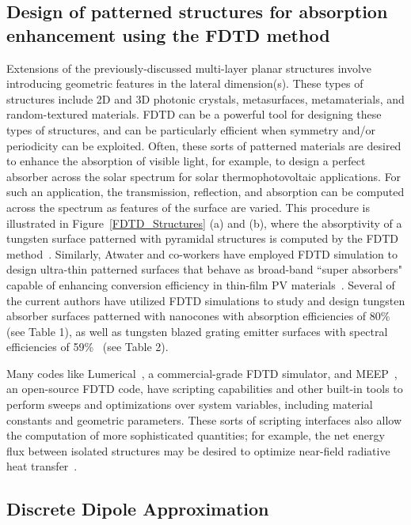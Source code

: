 \documentclass[10pt,letterpaper]{article}
\begin{document}
\subsection{Design of patterned structures for absorption enhancement using the FDTD method}
Extensions of the previously-discussed multi-layer planar structures involve introducing geometric features in the
lateral dimension(s).  These types of structures include 2D and 3D photonic crystals, metasurfaces, metamaterials, and random-textured materials.
FDTD can be a powerful tool for designing these types of structures, and can be particularly efficient when symmetry and/or periodicity can be
exploited.  Often, these sorts of patterned materials are desired to enhance the absorption of visible light, for example, to design a perfect
absorber across the solar spectrum for solar thermophotovoltaic applications.  For such an application, the transmission, reflection, and
absorption can be computed across the spectrum as features of the surface are varied.  This procedure is illustrated in Figure~\ref{FDTD_Structures} (a) and (b), where the absorptivity of a tungsten surface patterned with pyramidal structures is computed by the FDTD method~\cite{paper1_ref4}. Similarly, Atwater and co-workers
have employed FDTD simulation to design ultra-thin patterned surfaces that behave as broad-band
``super absorbers" capable of enhancing conversion efficiency in
thin-film PV materials~\cite{AFB_NatComm_2011}.  Several of the current authors have utilized FDTD simulations to 
study and
design tungsten absorber surfaces patterned with nanocones 
with absorption efficiencies of 80\%~\cite{me1} (see Table 1),
as well as tungsten blazed grating emitter surfaces with spectral efficiencies of 59\%~\cite{me2} (see Table 2).

Many codes like Lumerical~\cite{lumerical}, a commercial-grade
FDTD simulator, and MEEP~\cite{Meep}, an open-source FDTD code, have scripting
capabilities and other built-in tools to perform sweeps and optimizations over system variables, including material constants and geometric
parameters.  
These sorts of scripting interfaces also allow the computation of more sophisticated quantities; for example, the net energy flux between isolated
structures may be desired to optimize near-field radiative heat transfer~\cite{datas2013}.

\subsection{Discrete Dipole Approximation}
\end{document}
